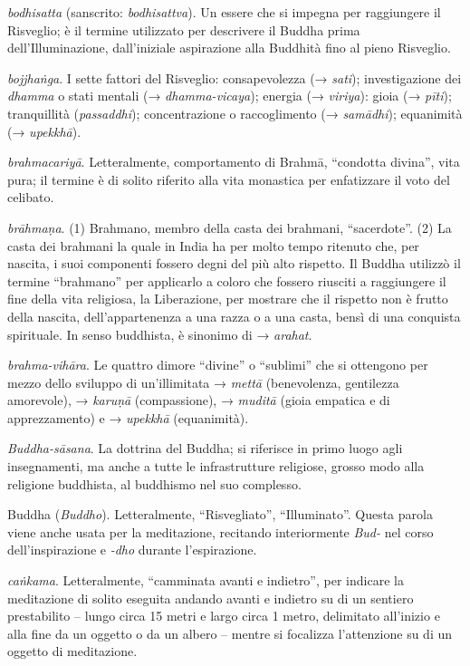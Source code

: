 \emph{bodhisatta} (sanscrito: \emph{bodhisattva}). Un essere che si
impegna per raggiungere il Risveglio; è il termine utilizzato per
descrivere il Buddha prima dell'Illuminazione, dall'iniziale aspirazione
alla Buddhità fino al pieno Risveglio.

\emph{bojjhaṅga}. I sette fattori del Risveglio: consapevolezza (→
\emph{sati}); investigazione dei \emph{dhamma} o stati mentali (→
\emph{dhamma-vicaya}); energia (→ \emph{viriya}): gioia (→ \emph{pīti});
tranquillità (\emph{passaddhi}); concentrazione o raccoglimento (→
\emph{samādhi}); equanimità (→ \emph{upekkhā}).

\emph{brahmacariyā}. Letteralmente, comportamento di Brahmā, ``condotta
divina'', vita pura; il termine è di solito riferito alla vita monastica
per enfatizzare il voto del celibato.

\emph{brāhmaṇa}. (1) Brahmano, membro della casta dei brahmani,
``sacerdote''. (2) La casta dei brahmani la quale in India ha per molto
tempo ritenuto che, per nascita, i suoi componenti fossero degni del più
alto rispetto. Il Buddha utilizzò il termine ``brahmano'' per applicarlo
a coloro che fossero riusciti a raggiungere il fine della vita
religiosa, la Liberazione, per mostrare che il rispetto non è frutto
della nascita, dell'appartenenza a una razza o a una casta, bensì di una
conquista spirituale. In senso buddhista, è sinonimo di → \emph{arahat}.

\emph{brahma-vihāra}. Le quattro dimore ``divine'' o ``sublimi'' che si
ottengono per mezzo dello sviluppo di un'illimitata → \emph{mettā}
(benevolenza, gentilezza amorevole), → \emph{karuṇā} (compassione), →
\emph{muditā} (gioia empatica e di apprezzamento) e → \emph{upekkhā}
(equanimità).

\emph{Buddha-sāsana}. La dottrina del Buddha; si riferisce in primo
luogo agli insegnamenti, ma anche a tutte le infrastrutture religiose,
grosso modo alla religione buddhista, al buddhismo nel suo complesso.

Buddha (\emph{Buddho}). Letteralmente, ``Risvegliato'', ``Illuminato''.
Questa parola viene anche usata per la meditazione, recitando
interiormente \emph{Bud-} nel corso dell'inspirazione e \emph{-dho}
durante l'espirazione.

\emph{caṅkama}. Letteralmente, ``camminata avanti e indietro'', per
indicare la meditazione di solito eseguita andando avanti e indietro su
di un sentiero prestabilito -- lungo circa 15 metri e largo circa 1
metro, delimitato all'inizio e alla fine da un oggetto o da un albero --
mentre si focalizza l'attenzione su di un oggetto di meditazione.

